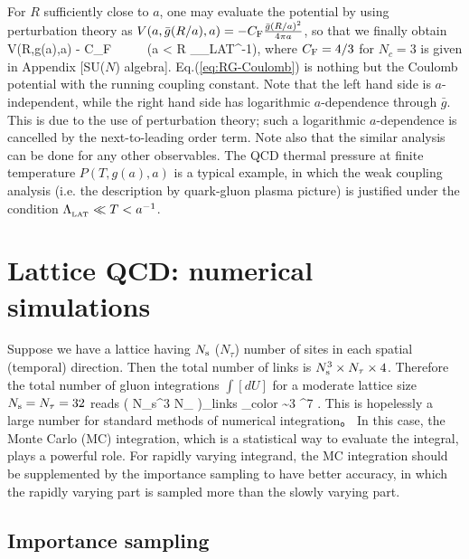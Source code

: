For $R$ sufficiently close to $a$, one may evaluate the potential by using perturbation theory as
$V (a, \bar{g}(R/a), a)  = - C_{{\rm F}} \frac{\bar{g}(R/a)^2}{4\pi a}$, so that we finally obtain
\beq
\label{eq:RG-Coulomb}
V(R,g(a),a) \simeq - C_{{\rm F}}  \ \ \ \ \ (a < R \ll  \Lambda_{_{\rm LAT}}^{-1}),
\eeq
where $C_{{\rm F}}=4/3$ for $N_c=3$ is given in Appendix [SU($N$) algebra].
Eq.(\ref{eq:RG-Coulomb}) is nothing but the Coulomb potential with the running coupling constant.
Note that the left hand side is $a$-independent, while the right hand side has
logarithmic $a$-dependence through $\bar{g}$.  This is due to the use of perturbation theory;
such a logarithmic $a$-dependence  is cancelled by the next-to-leading order term.
Note also that the similar analysis can be done for any other observables.
The QCD thermal pressure at finite temperature $P(T,g(a),a)$ is a typical example, in which 
the weak coupling analysis (i.e. the description by  quark-gluon plasma picture)
is justified  under the condition  $  \Lambda_{_{\rm LAT}} \ll T < a^{-1}$. 



\section{Lattice QCD:  numerical simulations}


Suppose we have a lattice having $N_{\rm s}$ ($N_{\tau}$) number of sites
in each spatial (temporal) direction. Then 
 the total number of links is 
   $  N_{\rm s}^3 \times N_{\tau}  \times 4$. 
 Therefore the total  number of gluon integrations $\int [dU]$
 for a moderate lattice size  $N_{\rm s} = N_{\tau} =32$ reads
\beq
\label{eq:5.lattice-size}
 ( N_{\rm s}^3 \times N_{\tau}  )_{\rm links} _{\rm color} 
 \sim 3 ^7 .
 \eeq
 This is 
 hopelessly a large number  
  for standard methods of numerical integration。
   In this case,  the  Monte Carlo (MC) integration,
   which is a
  statistical way to evaluate the integral, plays a 
   powerful role. For rapidly varying integrand,
  the MC integration should be supplemented by the 
 importance sampling 
   to have better accuracy, in which the rapidly varying
   part is sampled more than the slowly varying part.
     
     
\subsection{Importance sampling}
\label{ss:IS}
    
